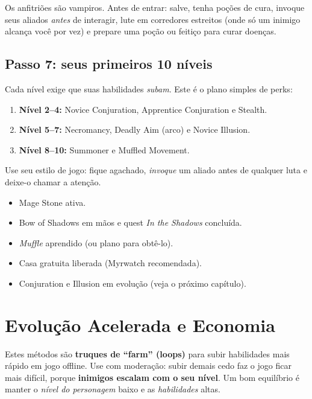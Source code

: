 \documentclass[11pt,a4paper,oneside,openany]{book}
\newcommand{\magia}[1]{\textit{\textcolor{SoulCairnPurple}{#1}}}
\newcommand{\perk}[1]{\textsf{\textcolor{SoulCairnPurple}{#1}}}
\begin{document}
\begin{alerta}
Os anfitriões são vampiros. Antes de entrar: salve, tenha poções de cura, invoque seus aliados \emph{antes} de interagir, lute em corredores estreitos (onde só um inimigo alcança você por vez) e prepare uma poção ou feitiço para curar doenças.
\end{alerta}

\section{Passo 7: seus primeiros 10 níveis}
Cada nível exige que suas habilidades \emph{subam}. Este é o plano simples de perks:
\begin{enumerate}
  \item \textbf{Nível 2--4:} \perk{Novice Conjuration}, \perk{Apprentice Conjuration} e \perk{Stealth}.
  \item \textbf{Nível 5--7:} \perk{Necromancy}, \perk{Deadly Aim} (arco) e \perk{Novice Illusion}.
  \item \textbf{Nível 8--10:} \perk{Summoner} e \perk{Muffled Movement}.
\end{enumerate}
Use seu estilo de jogo: fique agachado, \emph{invoque} um aliado antes de qualquer luta e deixe-o chamar a atenção.

\begin{checkpoint}
\begin{itemize}
  \item Mage Stone ativa.
  \item Bow of Shadows em mãos e quest \emph{In the Shadows} concluída.
  \item \magia{Muffle} aprendido (ou plano para obtê-lo).
  \item Casa gratuita liberada (Myrwatch recomendada).
  \item Conjuration e Illusion em evolução (veja o próximo capítulo).
\end{itemize}
\end{checkpoint}

\chapter{Evolução Acelerada e Economia}

Estes métodos são \textbf{truques de ``farm'' (loops)} para subir habilidades mais rápido em jogo offline. Use com moderação: subir demais cedo faz o jogo ficar mais difícil, porque \textbf{inimigos escalam com o seu nível}. Um bom equilíbrio é manter o \emph{nível do personagem} baixo e as \emph{habilidades} altas.
\end{document}
